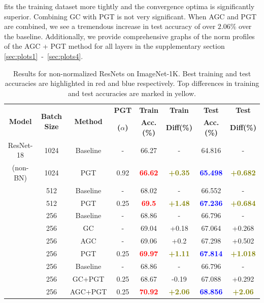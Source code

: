 \documentclass[runningheads]{llncs}
\begin{document}
\noindent
fits the training dataset more tightly and the convergence optima is significantly
superior. Combining GC with PGT is not very significant. When AGC and PGT are combined,
we see a tremendous increase in test accuracy of over $2.06\%$ over the baseline.
Additionally, we provide comprehensive graphs of the norm profiles of the AGC + PGT
method for all layers in the supplementary section \ref{sec:plots1}\ -\
\ref{sec:plots4}.




\begin{table}[!t]
\centering
\caption{ Results for non-normalized ResNets on ImageNet-1K. Best training and test
accuracies are highlighted in red and blue respectively. Top differences in training and
test accuracies are marked in yellow. }
\label{tab:wobn_table}
\begin{tabular}{cccccccc}
\multirow{2}{*}{\textbf{Model}} & \multirow{2}{*}{\textbf{Batch Size}} &
\multirow{2}{*}{\textbf{Method}} & \textbf{PGT} & \textbf{Train}
& \textbf{Train} & \textbf{Test} & \textbf{Test} \\
& & & \textbf{($\alpha$)} & \textbf{Acc.(\%)} & \textbf{Diff(\%)} &
\textbf{Acc.(\%)} & \textbf{Diff(\%)} \\
\midrule
ResNet-18 & 1024 & Baseline & - & 66.27 & - & 64.816 & - \\
(non-BN) & 1024 & PGT & 0.92 & \textcolor{red}{\textbf{66.62}} &
\textcolor{olive}{\textbf{+0.35}} & \textcolor{blue}{\textbf{65.498}} &
\textcolor{olive}{\textbf{+0.682}} \\
\cmidrule{2-8}
& 512 & Baseline & - & 68.02 & - & 66.552 & - \\
& 512 & PGT & 0.25 & \textcolor{red}{\textbf{69.5}} & \textcolor{olive}{\textbf{+1.48}}
& \textcolor{blue}{\textbf{67.236}} & \textcolor{olive}{\textbf{+0.684}} \\
\cmidrule{2-8}
& 256 & Baseline & - & 68.86 & - & 66.796 & - \\
& 256 & GC & - & 69.04 & +0.18 & 67.064 & +0.268 \\
& 256 & AGC & - & 69.06 & +0.2 & 67.298 & +0.502 \\
& 256 & PGT & 0.25 & \textcolor{red}{\textbf{69.97}} & \textcolor{olive}{\textbf{+1.11}}
& \textcolor{blue}{\textbf{67.814}} & \textcolor{olive}{\textbf{+1.018}} \\
\cmidrule{2-8}
& 256 & Baseline & - & 68.86 & - & 66.796 & - \\
& 256 & GC+PGT & 0.25 & 68.67 & -0.19 & 67.088 & +0.292 \\
& 256 & AGC+PGT & 0.25 & \textcolor{red}{\textbf{70.92}} &
\textcolor{olive}{\textbf{+2.06}} & \textcolor{blue}{\textbf{68.856}} &
\textcolor{olive}{\textbf{+2.06}} \\
\end{tabular}
\vspace{-0.5cm}
\end{table}
\end{document}
